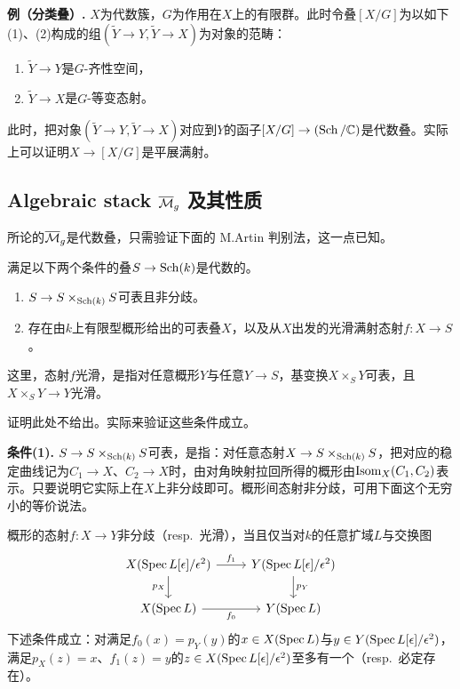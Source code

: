 
\noindent\textbf{例（分类叠）.}
$X$为代数簇，$G$为作用在$X$上的有限群。此时令叠$[X/G]$为以如下(1)、(2)构成的组$(\tilde Y\to Y,\tilde Y\to X)$为对象的范畴：
\begin{enumerate}[label=(\arabic*)]
\item $\tilde Y\to Y$是$G$-齐性空间，
\item $\tilde Y\to X$是$G$-等变态射。
\end{enumerate}
此时，把对象$(\tilde Y\to Y,\tilde Y\to X)$对应到$Y$的函子$[X/G]\to(\operatorname{Sch}/\mathbb{C})$是代数叠。实际上可以证明$X\to[X/G]$是平展满射。

\subsection{Algebraic stack $\overline{\mathcal{M}}_{g}$ 及其性质}

所论的$\overline{\mathcal{M}}_{g}$是代数叠，只需验证下面的 M.Artin 判别法，这一点已知。

\begin{theorem}[M.Artin]
满足以下两个条件的叠$S\to\operatorname{Sch}(k)$是代数的。
\begin{enumerate}[label=(\arabic*)]
\item $S\to S\times_{\operatorname{Sch}(k)}S$可表且非分歧。
\item 存在由$k$上有限型概形给出的可表叠$X$，以及从$X$出发的光滑满射态射$f:X\to S$。
\end{enumerate}
这里，态射$f$光滑，是指对任意概形$Y$与任意$Y\to S$，基变换$X\times_SY$可表，且$X\times_SY\to Y$光滑。
\end{theorem}

证明此处不给出。实际来验证这些条件成立。

\noindent\textbf{条件(1).}
$S\to S\times_{\operatorname{Sch}(k)}S$可表，是指：对任意态射$X\to S\times_{\operatorname{Sch}(k)}S$，把对应的稳定曲线记为$C_1\to X$、$C_2\to X$时，由对角映射拉回所得的概形由$\operatorname{Isom}_X(C_1,C_2)$表示。只要说明它实际上在$X$上非分歧即可。概形间态射非分歧，可用下面这个无穷小的等价说法。

\begin{lemma}
概形的态射$f:X\to Y$非分歧（resp.\ 光滑），当且仅当对$k$的任意扩域$L$与交换图
\[
\begin{tikzcd}
X(\Spec L[\epsilon]/\epsilon^2) \arrow[r, "f_1"] \arrow[d, "p_X"'] & Y(\Spec L[\epsilon]/\epsilon^2) \arrow[d, "p_Y"] \\
X(\Spec L) \arrow[r, "f_0"'] & Y(\Spec L)
\end{tikzcd}
\]
下述条件成立：对满足$f_0(x)=p_Y(y)$的$x\in X(\operatorname{Spec} L)$与$y\in Y(\operatorname{Spec} L[\epsilon]/\epsilon^2)$，满足$p_X(z)=x$、$f_1(z)=y$的$z\in X(\operatorname{Spec} L[\epsilon]/\epsilon^2)$至多有一个（resp.\ 必定存在）。
\end{lemma}

